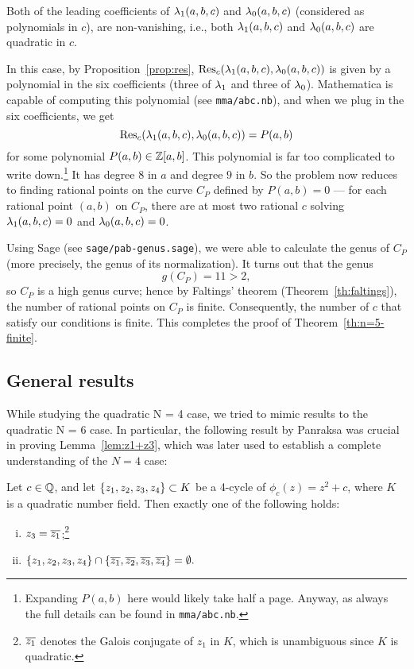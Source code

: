 \begin{case}
  Both of the leading coefficients of $\lambda_1(a, b, c)$ and $\lambda_0(a, b,
  c)$ (considered as polynomials in $c$), are non-vanishing, i.e.,
  both $\lambda_1(a, b, c)$ and $\lambda_0(a, b, c)$ are quadratic in $c$.

  In this case, by Proposition~\ref{prop:res}, $\mathrm{Res}_c(\lambda_1(a, b, c),
  \lambda_0(a, b, c))$ is given by a polynomial in the six coefficients
  (three of $\lambda_1$ and three of $\lambda_0$). Mathematica is capable of
  computing this polynomial (see \texttt{mma/abc.nb}), and when we
  plug in the six coefficients, we get
  \[
  \label{eq:pab}
  \mathrm{Res}_c(\lambda_1(a, b, c), \lambda_0(a, b, c)) = P(a, b)
  \]
  for some polynomial $P(a, b) \in \mathbb{Z}[a, b]$. This polynomial is far
  too complicated to write down.\footnote{%
    Expanding $P(a, b)$ here would likely take half a page. Anyway,
    as always the full details can be found in \texttt{mma/abc.nb}.}
  It has degree $8$ in $a$ and degree $9$ in $b$. So the problem now
  reduces to finding rational points on the curve $C_P$ defined by
  $P(a, b) = 0$ --- for each rational point $(a, b)$ on $C_P$, there
  are at most two rational $c$ solving $\lambda_1(a, b, c) = 0$ and
  $\lambda_0(a, b, c) = 0$.

  Using Sage (see \texttt{sage/pab-genus.sage}), we were able to
  calculate the genus of $C_P$ (more precisely, the genus of its
  normalization). It turns out that the genus
  \[
  g(C_P) = 11 > 2,
  \]
  so $C_P$ is a high genus curve; hence by Faltings' theorem
  (Theorem~\ref{th:faltings}), the number of rational points on $C_P$
  is finite. Consequently, the number of $c$ that satisfy our
  conditions is finite. This completes the proof of
  Theorem~\ref{th:n=5-finite}.
\end{case}

\subsection{General results}
\label{subsec:general}

While studying the quadratic N = 4 case, we tried to mimic results
to the quadratic N = 6 case. In particular, the following result by
Panraksa was crucial in proving Lemma~\ref{lem:z1+z3}, which was later
used to establish a complete understanding of the $N = 4$ case:

\begin{theorem} 
  Let $c \in \mathbb{Q}$, and let $\left\{z_1, z_2, z_3, z_4\right\} \subset K$ be a
  4-cycle of $\phi_c(z) = z^2 + c$, where $K$ is a quadratic number
  field. Then exactly one of the following holds:
  \begin{enumerate}[(i)]
  \item $z_3 = \overline{z_1}$;\footnote{%
      $\overline{z_1}$ denotes the Galois conjugate of $z_1$ in $K$, which
      is unambiguous since $K$ is quadratic.}

  \item $\{z_1, z_2, z_3, z_4\} \cap \{\overline{z_1}, \overline{z_2}, \overline{z_3},
    \overline{z_4}\} =\emptyset.$
  \end{enumerate}
\end{theorem}

